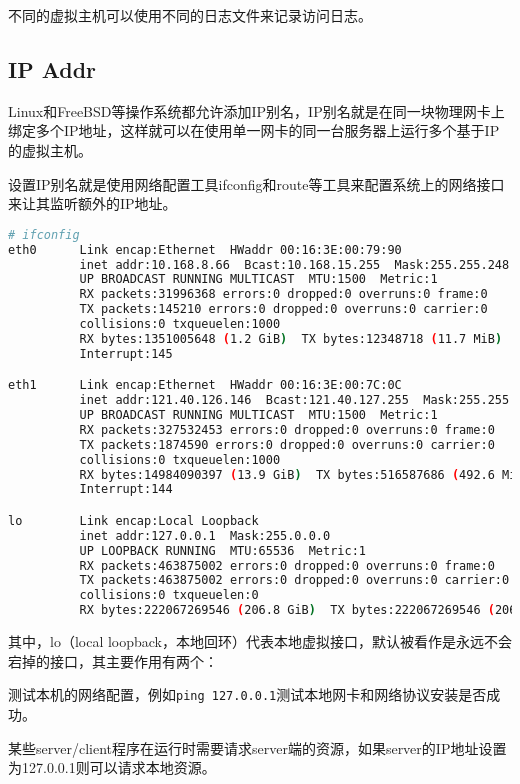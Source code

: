 不同的虚拟主机可以使用不同的日志文件来记录访问日志。


\subsection{IP Addr}

Linux和FreeBSD等操作系统都允许添加IP别名，IP别名就是在同一块物理网卡上绑定多个IP地址，这样就可以在使用单一网卡的同一台服务器上运行多个基于IP的虚拟主机。

设置IP别名就是使用网络配置工具ifconfig和route等工具来配置系统上的网络接口来让其监听额外的IP地址。



\begin{lstlisting}[language=bash]
# ifconfig
eth0      Link encap:Ethernet  HWaddr 00:16:3E:00:79:90  
          inet addr:10.168.8.66  Bcast:10.168.15.255  Mask:255.255.248.0
          UP BROADCAST RUNNING MULTICAST  MTU:1500  Metric:1
          RX packets:31996368 errors:0 dropped:0 overruns:0 frame:0
          TX packets:145210 errors:0 dropped:0 overruns:0 carrier:0
          collisions:0 txqueuelen:1000 
          RX bytes:1351005648 (1.2 GiB)  TX bytes:12348718 (11.7 MiB)
          Interrupt:145 

eth1      Link encap:Ethernet  HWaddr 00:16:3E:00:7C:0C  
          inet addr:121.40.126.146  Bcast:121.40.127.255  Mask:255.255.252.0
          UP BROADCAST RUNNING MULTICAST  MTU:1500  Metric:1
          RX packets:327532453 errors:0 dropped:0 overruns:0 frame:0
          TX packets:1874590 errors:0 dropped:0 overruns:0 carrier:0
          collisions:0 txqueuelen:1000 
          RX bytes:14984090397 (13.9 GiB)  TX bytes:516587686 (492.6 MiB)
          Interrupt:144 

lo        Link encap:Local Loopback  
          inet addr:127.0.0.1  Mask:255.0.0.0
          UP LOOPBACK RUNNING  MTU:65536  Metric:1
          RX packets:463875002 errors:0 dropped:0 overruns:0 frame:0
          TX packets:463875002 errors:0 dropped:0 overruns:0 carrier:0
          collisions:0 txqueuelen:0 
          RX bytes:222067269546 (206.8 GiB)  TX bytes:222067269546 (206.8 GiB)
\end{lstlisting}

其中，lo（local loopback，本地回环）代表本地虚拟接口，默认被看作是永远不会宕掉的接口，其主要作用有两个：

\begin{compactitem}
\item 测试本机的网络配置，例如\texttt{ping 127.0.0.1}测试本地网卡和网络协议安装是否成功。
\item 某些server/client程序在运行时需要请求server端的资源，如果server的IP地址设置为127.0.0.1则可以请求本地资源。
\end{compactitem}

